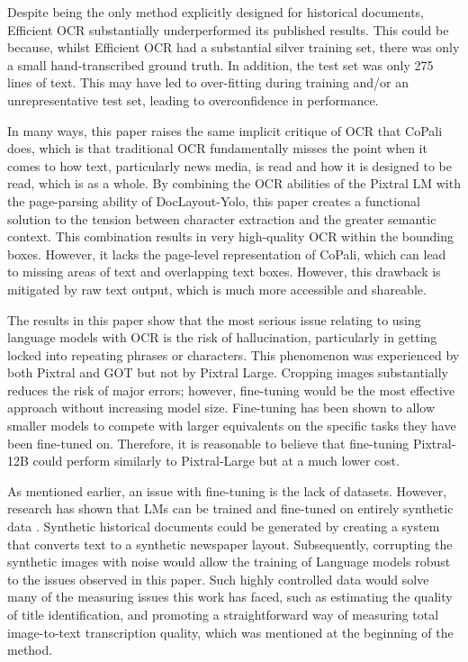 \documentclass{article} %
\begin{document}
Despite being the only method explicitly designed for historical documents, Efficient OCR substantially underperformed its published results. This could be because, whilst Efficient OCR had a substantial silver training set, there was only a small hand-transcribed ground truth. In addition, the test set was only 275 lines of text. This may have led to over-fitting during training and/or an unrepresentative test set, leading to overconfidence in performance.

In many ways, this paper raises the same implicit critique of OCR that CoPali \cite{faysse_colpali_2024} does, which is that traditional OCR fundamentally misses the point when it comes to how text, particularly news media, is read and how it is designed to be read, which is as a whole. By combining the OCR abilities of the Pixtral LM with the page-parsing ability of DocLayout-Yolo, this paper creates a functional solution to the tension between character extraction and the greater semantic context. This combination results in very high-quality OCR within the bounding boxes. However, it lacks the page-level representation of CoPali, which can lead to missing areas of text and overlapping text boxes. However, this drawback is mitigated by raw text output, which is much more accessible and shareable.

The results in this paper show that the most serious issue relating to using language models with OCR is the risk of hallucination, particularly in getting locked into repeating phrases or characters. This phenomenon was experienced by both Pixtral and GOT but not by Pixtral Large. Cropping images substantially reduces the risk of major errors; however, fine-tuning would be the most effective approach without increasing model size. Fine-tuning has been shown to allow smaller models to compete with larger equivalents on the specific tasks they have been fine-tuned on. Therefore, it is reasonable to believe that fine-tuning Pixtral-12B could perform similarly to Pixtral-Large but at a much lower cost.

As mentioned earlier, an issue with fine-tuning is the lack of datasets. However, research has shown that LMs can be trained and fine-tuned on entirely synthetic data \cite{gunasekar_textbooks_2023, li_textbooks_2023, tan_15-pints_2024, wei_general_2024, bourne_scrambled_2024-1}. Synthetic historical documents could be generated by creating a system that converts text to a synthetic newspaper layout. Subsequently, corrupting the synthetic images with noise \cite{gupte_lights_2021} would allow the training of Language models robust to the issues observed in this paper. Such highly controlled data would solve many of the measuring issues this work has faced, such as estimating the quality of title identification, and promoting a straightforward way of measuring total image-to-text transcription quality, which was mentioned at the beginning of the method.
\end{document}
